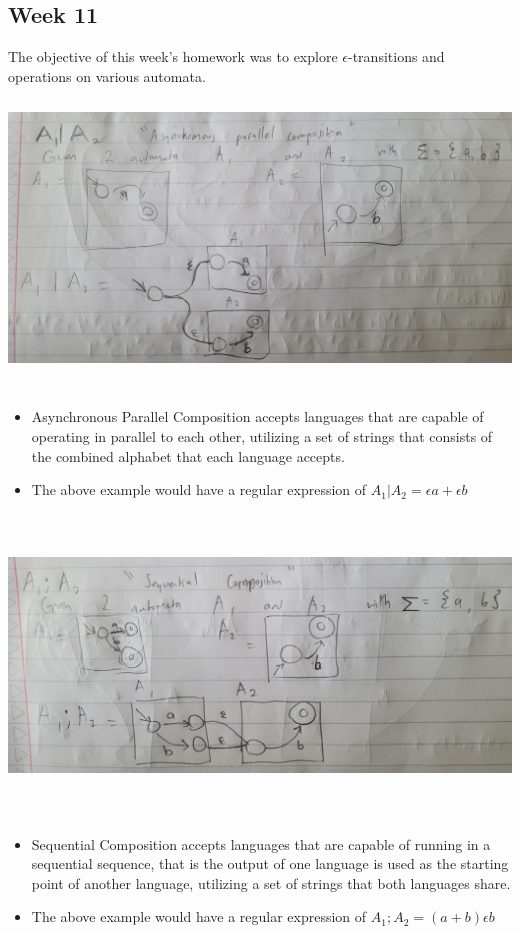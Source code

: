 \documentclass{article}
\theoremstyle{theorem}
\theoremstyle{definition}
\theoremstyle{remark}
\begin{document}
\subsection{Week 11}
The objective of this week's homework was to explore $\epsilon $-transitions and operations on various automata.
\\ \includegraphics[width=15cm, height=8cm]{Report Images/HW11_1.jpg}
\begin{itemize}
    \item Asynchronous Parallel Composition accepts languages that are capable of operating in parallel to each other, utilizing a set of strings that consists of the combined alphabet that each language accepts.
    \item The above example would have a regular expression of $A_{1} | A_{2} = \epsilon a + \epsilon b $
\end{itemize}
\includegraphics[width=15cm, height=8cm]{Report Images/HW11_2.jpg}
\begin{itemize}
    \item Sequential Composition accepts languages that are capable of running in a sequential sequence, that is the output of one language is used as the starting point of another language, utilizing a set of strings that both languages share.
    \item The above example would have a regular expression of $A_{1} ; A_{2} = (a+b)\epsilon b$
\end{itemize}
\end{document}
